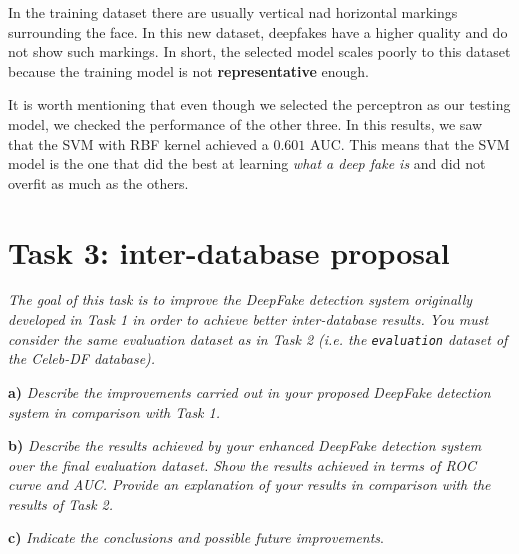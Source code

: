 \documentclass[11pt]{article}
\begin{document}
In the training dataset there are usually vertical nad horizontal markings surrounding the face. In this new dataset, deepfakes have a higher quality and do not show such markings. In short, the selected model scales poorly to this dataset because the training model is not \textbf{representative} enough.


It is worth mentioning that even though we selected the perceptron as our testing model, we checked the performance of the other three. In this results, we saw that the SVM with RBF kernel achieved a \( 0.601 \) AUC. This means that the SVM model is the one that did the best at learning \emph{what a deep fake is} and did not overfit as much as the others.


\section*{Task 3: inter-database proposal}

\textit{The goal of this task is to improve the DeepFake detection system originally developed in Task 1 in order to achieve better inter-database results. You must consider the same evaluation dataset as in Task 2 (i.e. the \texttt{evaluation} dataset of the Celeb-DF database).}

\textbf{a)} \textit{Describe the improvements carried out in your proposed DeepFake detection system in comparison with Task 1.}

\textbf{b)} \textit{Describe the results achieved by your enhanced DeepFake detection system over the final evaluation dataset. Show the results achieved in terms of ROC curve and AUC. Provide an explanation of your results in comparison with the results of Task 2.}

\textbf{c)} \textit{Indicate the conclusions and possible future improvements}.




\end{document}
